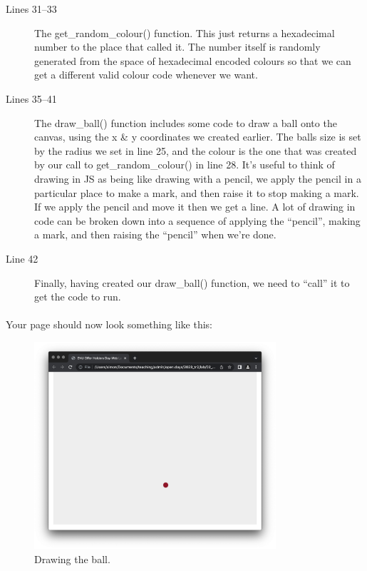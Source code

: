 \documentclass[10pt, a4paper, oneside]{article}
\begin{document}
\begin{description}
\item[Lines 31--33] The get\_random\_colour() function. This just returns a hexadecimal number to the place that called it. The number itself is randomly generated from the space of hexadecimal encoded colours so that we can get a different valid colour code whenever we want.
\item[Lines 35--41] The draw\_ball() function includes some code to draw a ball onto the canvas, using the x \& y coordinates we created earlier. The balls size is set by the radius we set in line 25, and the colour is the one that was created by our call to get\_random\_colour() in line 28. It's useful to think of drawing in JS as being like drawing with a pencil, we apply the pencil in a particular place to make a mark, and then raise it to stop making a mark. If we apply the pencil and move it then we get a line. A lot of drawing in code can be broken down into a sequence of applying the ``pencil'', making a mark, and then raising the ``pencil'' when we're done.
\item[Line 42] Finally, having created our draw\_ball() function, we need to ``call'' it to get the code to run.
\end{description}

\paragraph{} Your page should now look something like this:

\begin{figure}[H]
\centering
\includegraphics[width=0.8\textwidth]{images/02_drawing+a_draw_ball.png}
\caption{Drawing the ball.}
\label{fig:02_drawing+a_draw_ball}
\end{figure}
\end{document}
